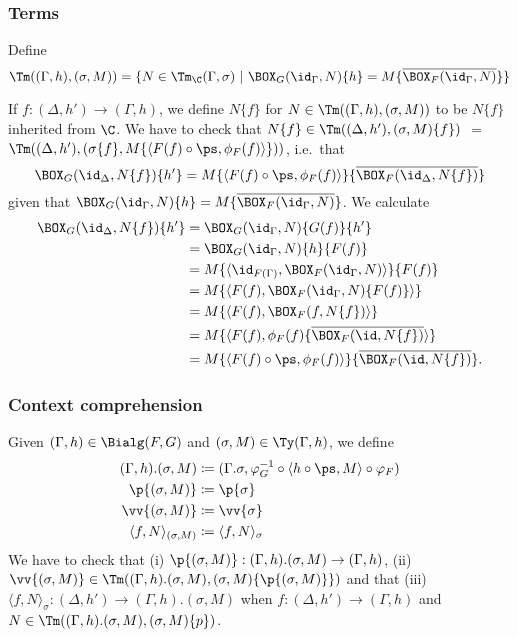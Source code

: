 \documentclass{article}
\newcommand{\isoFL}{\ensuremath{\phi_{F}}} %
\begin{document}
\subsubsection{Terms}

Define
\[
\Tm((\Gamma, h), (\sigma, M)) = \{ N \in \Tm_{\C}(\Gamma, \sigma) \ |\
   \BOX_G(\id_\Gamma, N)\{h\} = M\{\overline{\BOX_F(\id_{\Gamma}, N)}\}\}
\]

If $f : (\Delta, h') \to (\Gamma, h)$, we define $N\{f\}$ for $N \in
\Tm((\Gamma, h), (\sigma, M))$ to be $N\{f\}$ inherited from $\C$. We
have to check that $N\{f\} \in \Tm((\Delta, h'), (\sigma, M)\{f\})$
$=$ $\Tm((\Delta, h'), (\sigma\{f\}, M\{\langle F(f) \circ \ps,
\isoFL(f)\rangle\}))$, i.e.\ that
\[
\BOX_G(\id_\Delta, N\{f\})\{h'\} = M\{\langle F(f) \circ \ps,
\isoFL(f)\rangle\}\{\overline{\BOX_F(\id_{\Delta}, N\{f\})}\}
\]
given that $\BOX_G(\id_\Gamma, N)\{h\} =
M\{\overline{\BOX_F(\id_{\Gamma}, N)}\}$. 
We calculate
\begin{align*}
  \BOX_G(\id_\Delta, N\{f\})\{h'\}
&= \BOX_G(\id_\Gamma, N)\{G(f)\}\{h'\} \\
&= \BOX_G(\id_\Gamma, N)\{h\}\{F(f)\} \\
&= M\{\langle\id_{F(\Gamma)}, \BOX_F(\id_{\Gamma}, N)\rangle\}\{F(f)\} \\
&= M\{\langle F(f), \BOX_F(\id_{\Gamma}, N)\{F(f)\}\rangle\} \\
&= M\{\langle F(f), \BOX_F(f, N\{f\})\rangle\} \\
&= M\{\langle F(f), \isoFL(f)\{\overline{\BOX_F(\id, N\{f\})}\rangle\} \\
&= M\{\langle F(f) \circ \ps, \isoFL(f)\rangle\}\{\overline{\BOX_F(\id, N\{f\})}\} .
\end{align*}

\subsubsection{Context comprehension}

Given $(\Gamma, h) \in \Bialg(F, G)$ and $(\sigma, M) \in \Ty(\Gamma,
h)$, we define
\begin{align*}
(\Gamma, h).(\sigma, M) &\coloneqq
  (\Gamma.\sigma, \varphi_G^{-1} \circ \langle h \circ \ps, M \rangle \circ \varphi_F) \\
\p{(\sigma, M)} &\coloneqq \p{\sigma} \\
\vv{(\sigma, M)} &\coloneqq \vv{\sigma} \\
\langle f , N\rangle_{(\sigma, M)} &\coloneqq \langle f , N\rangle_{\sigma}
\end{align*}
We have to check that (i) $\p{(\sigma, M)} : (\Gamma, h).(\sigma, M)
\to (\Gamma, h)$, (ii) $\vv{(\sigma, M)} \in \Tm((\Gamma, h).(\sigma,
M), (\sigma, M)\{\p{(\sigma, M)}\})$ and that (iii) $\langle f ,
N\rangle_{\sigma} : (\Delta, h') \to (\Gamma, h).(\sigma, M)$ when $f
: (\Delta, h') \to (\Gamma, h)$ and $N \in \Tm((\Gamma, h).(\sigma, M), (\sigma, M)\{p\})$.
\end{document}
